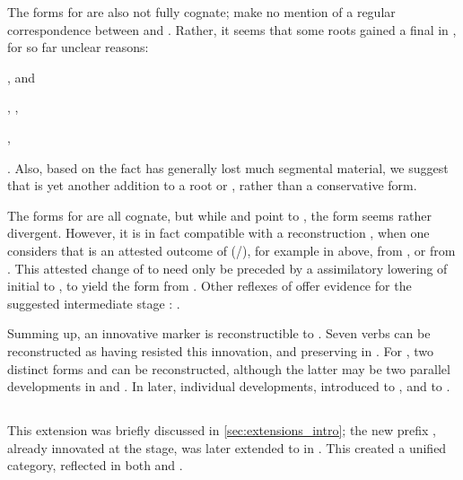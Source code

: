 The forms for  are also not fully cognate; \textcite{meira2005southern} make no mention of a regular correspondence between \bakairi {} and \ikpeng {}.
Rather, it seems that some roots gained a final  in \PXin, for so far unclear reasons: \begin{inlinelist}
\item \PC {} , \arara and \ikpeng {} \parencites[8]{gildea2007greenberg}[56]{alves2017arara}[25]{ikpengpacheco2001}
\item \PC {} , \arara {}, \ikpeng {} \parencites[8]{gildea2007greenberg}[144]{alves2017arara}[270]{ikpengpacheco2001}
\item \PC {} , \arara {}  \parencites[8]{gildea2007greenberg}[57]{alves2017arara}
\end{inlinelist}.
Also, based on the fact \bakairi has generally lost much segmental material, we suggest that \bakairi {} is yet another addition to a root  or , rather than a conservative form.

The forms for  are all cognate, but while \arara and \bakairi point to , the \ikpeng form seems rather divergent.
However, it is in fact compatible with a reconstruction , when one considers that \ikpeng {} is an attested outcome of  (\PXin {}/), for example   in  above,   \parencite[24]{ikpengpacheco2001} from \PC {} \parencite[12]{gildea2007greenberg}, or   from \PC {}.
This attested change of  to  need only be preceded by a assimilatory lowering of initial  to , to yield the form  from .
Other \ikpeng reflexes of  offer evidence for the suggested intermediate stage :   \parencite[25]{ikpengpacheco2001}.

Summing up, an innovative  marker  is reconstructible to \PPek.
Seven verbs can be reconstructed as having resisted this innovation, and preserving   in \PPek.
For , two distinct forms  and  can be reconstructed, although the latter may be two parallel developments in \bakairi and \ikpeng.
In later, individual developments, \bakairi introduced  to , and \ikpeng to .

\subsection{\PWai {}}
\label{sec:waiwaian}
This extension was briefly discussed in \cref{sec:extensions_intro}; the new  prefix , already innovated at the \PPar stage, was later extended to  in \PWai.
This created a unified  category, reflected in both \hixka and \waiwai {}.

